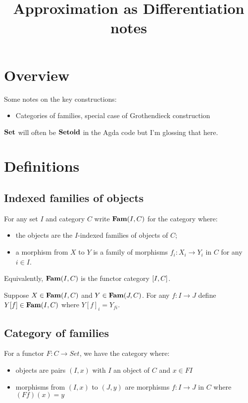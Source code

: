\documentclass{acmart}
\begin{document}
\title{Approximation as Differentiation notes}
\maketitle

\section{Overview}

Some notes on the key constructions:
\begin{itemize}
\item Categories of families, special case of Grothendieck construction
\end{itemize}

\noindent $\mathbf{Set}$ will often be $\mathbf{Setoid}$ in the Agda code but I'm glossing that here.

\section{Definitions}

\subsection{Indexed families of objects}

For any set $I$ and category $C$ write $\mathbf{Fam}(I,C)$ for the category where:
\begin{itemize}
\item the objects are the $I$-indexed families of objects of $C$;
\item a morphism from $X$ to $Y$ is a family of morphisms $f_i: X_i \to Y_i$ in $C$ for any $i \in I$.
\end{itemize}

\noindent Equivalently, $\mathbf{Fam}(I,C)$ is the functor category $[I,C]$.

\noindent Suppose $X \in \mathbf{Fam}(I,C)$ and $Y \in \mathbf{Fam}(J,C)$. For any $f: I \to J$ define $Y[f] \in \mathbf{Fam}(I,C)$ where $Y[f]_i = Y_{fi}$.

\subsection{Category of families}

For a functor $F: C \to Set$, we have the category where:
\begin{itemize}
\item objects are pairs $(I, x)$ with $I$ an object of $C$ and $x \in FI$
\item morphisms from $(I, x)$ to $(J, y)$ are morphisms $f: I \to J$ in $C$ where $(Ff)(x) = y$
\end{itemize}
\end{document}
